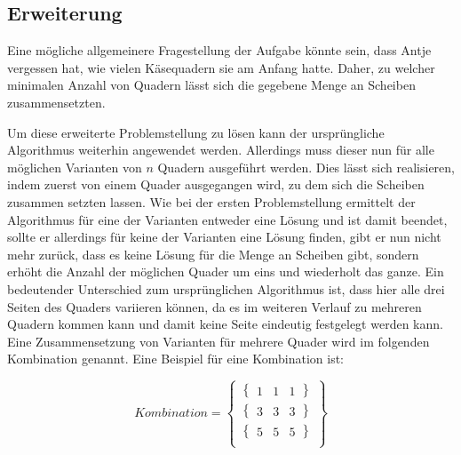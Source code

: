 \documentclass[a4paper,10pt,ngerman]{scrartcl}
\begin{document}
    \subsection{Erweiterung}\label{subsec:erweiterung_losungsidee}

    Eine mögliche allgemeinere Fragestellung der Aufgabe könnte sein, dass Antje vergessen hat,
    wie vielen Käsequadern sie am Anfang hatte.
    Daher, zu welcher minimalen Anzahl von Quadern lässt sich die gegebene Menge an Scheiben zusammensetzten.

    Um diese erweiterte Problemstellung zu lösen kann der ursprüngliche Algorithmus weiterhin angewendet werden.
    Allerdings muss dieser nun für alle möglichen Varianten von $n$ Quadern ausgeführt werden.
    Dies lässt sich realisieren, indem zuerst von einem Quader ausgegangen wird, zu dem sich die Scheiben zusammen setzten lassen.
    Wie bei der ersten Problemstellung ermittelt der Algorithmus für eine der Varianten entweder eine Lösung und ist damit beendet,
    sollte er allerdings für keine der Varianten eine Lösung finden, gibt er nun nicht mehr zurück, dass es keine Lösung für die Menge an Scheiben gibt,
    sondern erhöht die Anzahl der möglichen Quader um eins und wiederholt das ganze.
    Ein bedeutender Unterschied zum ursprünglichen Algorithmus ist, dass hier alle drei Seiten des Quaders variieren können,
    da es im weiteren Verlauf zu mehreren Quadern kommen kann und damit keine Seite eindeutig festgelegt werden kann.
    Eine Zusammensetzung von Varianten für mehrere Quader wird im folgenden Kombination genannt.
    Eine Beispiel für eine Kombination ist:

    \[
        Kombination = \begin{Bmatrix}
                          \begin{Bmatrix}
                              1 & 1 & 1
                          \end{Bmatrix} \\
                          \begin{Bmatrix}
                              3 & 3 & 3
                          \end{Bmatrix} \\
                          \begin{Bmatrix}
                              5 & 5 & 5
                          \end{Bmatrix} \\
        \end{Bmatrix}
    \]
\end{document}
